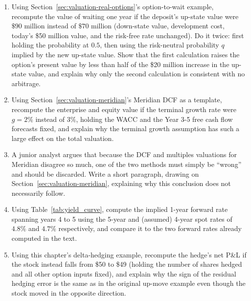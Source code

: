 \documentclass[../ai_in_finance]{subfiles}
\begin{document}
\begin{enumerate}[exercises]
    \item\label{ex:valuation-option-to-wait} Using Section~\ref{sec:valuation-real-options}'s option-to-wait example, recompute the value of waiting one year if the deposit's up-state value were $\$90$ million instead of $\$70$ million (down-state value, development cost, today's \$50 million value, and the risk-free rate unchanged). Do it twice: first holding the probability at $0.5$, then using the risk-neutral probability $q$ implied by the new up-state value. Show that the first calculation raises the option's present value by less than half of the \$20 million increase in the up-state value, and explain why only the second calculation is consistent with no arbitrage.
    \item Using Section~\ref{sec:valuation-meridian}'s Meridian DCF as a template, recompute the enterprise and equity value if the terminal growth rate were $g=2\%$ instead of $3\%$, holding the WACC and the Year 3-5 free cash flow forecasts fixed, and explain why the terminal growth assumption has such a large effect on the total valuation.
    \item A junior analyst argues that because the DCF and multiples valuations for Meridian disagree so much, one of the two methods must simply be ``wrong'' and should be discarded. Write a short paragraph, drawing on Section~\ref{sec:valuation-meridian}, explaining why this conclusion does not necessarily follow.
    \item Using Table~\ref{tab:yield_curve}, compute the implied 1-year forward rate spanning years 4 to 5 using the 5-year and (assumed) 4-year spot rates of $4.8\%$ and $4.7\%$ respectively, and compare it to the two forward rates already computed in the text.
    \item Using this chapter's delta-hedging example, recompute the hedge's net P\&L if the stock instead falls from \$50 to \$49 (holding the number of shares hedged and all other option inputs fixed), and explain why the sign of the residual hedging error is the same as in the original up-move example even though the stock moved in the opposite direction.

\end{enumerate}
\end{document}
